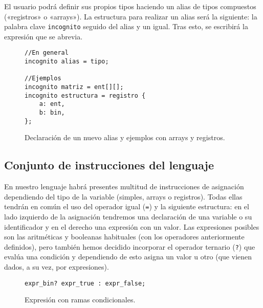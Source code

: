 El usuario podrá definir sus propios tipos haciendo un alias de tipos
compuestos («registros» o «arrays»). La estructura para realizar un alias será la
siguiente: la palabra clave \lstinline{incognito} seguido del alias y un igual. Tras esto,
se escribirá la expresión que se abrevia.
\begin{figure}[htbp]
    \centering
    \begin{lstlisting}
//En general
incognito alias = tipo;

//Ejemplos
incognito matriz = ent[][];
incognito estructura = registro {
    a: ent,
    b: bin,
};
    \end{lstlisting}
    \caption{Declaración de un nuevo alias y ejemplos con arrays y registros.}
\end{figure}

\subsection{Conjunto de instrucciones del lenguaje}
En nuestro lenguaje habrá presentes multitud de instrucciones de asignación
dependiendo del tipo de la variable (simples, arrays o registros). Todas ellas
tendrán en común el uso del operador igual (\lstinline{=}) y la siguiente estructura: en el
lado izquierdo de la asignación tendremos una declaración de una variable o su
identificador y en el derecho una expresión con un valor. Las expresiones
posibles son las aritméticas y booleanas habituales (con los operadores
anteriormente definidos), pero también hemos decidido incorporar el operador
ternario (\lstinline{?}) que evalúa una condición y dependiendo de esto asigna un valor u
otro (que vienen dados, a su vez, por expresiones). 
\begin{figure}[htbp]
    \centering
    \begin{lstlisting}
expr_bin? expr_true : expr_false;
    \end{lstlisting}
    \caption{Expresión con ramas condicionales.}
\end{figure}

